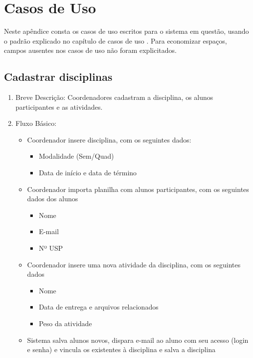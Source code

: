 \chapter{Casos de Uso}\label{chap:use-case-appendix}
Neste apêndice consta os casos de uso escritos para o sistema em questão, usando o padrão explicado no capítulo de casos de uso \cite{ibm2011}. Para economizar espaços, campos ausentes nos casos de uso não foram explicitados.

\section{Cadastrar disciplinas}
\begin{enumerate}
    \item Breve Descrição: Coordenadores cadastram a disciplina, os alunos participantes e as atividades.
    \item Fluxo Básico:
        \begin{itemize}
            \item Coordenador insere disciplina, com os seguintes dados:
            \begin{itemize}
                \item Modalidade (Sem/Quad)
                \item Data de início e data de término
            \end{itemize}
            \item Coordenador importa planilha com alunos participantes, com os seguintes dados dos alunos
            \begin{itemize}
                \item Nome
                \item E-mail
                \item Nº USP
            \end{itemize}
            \item Coordenador insere uma nova atividade da disciplina, com os seguintes dados
            \begin{itemize}
                \item Nome
                \item Data de entrega e arquivos relacionados
                \item Peso da atividade
            \end{itemize}
            \item Sistema salva alunos novos, dispara e-mail ao aluno com seu acesso (login e senha) e vincula os existentes à disciplina e salva a disciplina

\end{itemize}
\end{enumerate}
